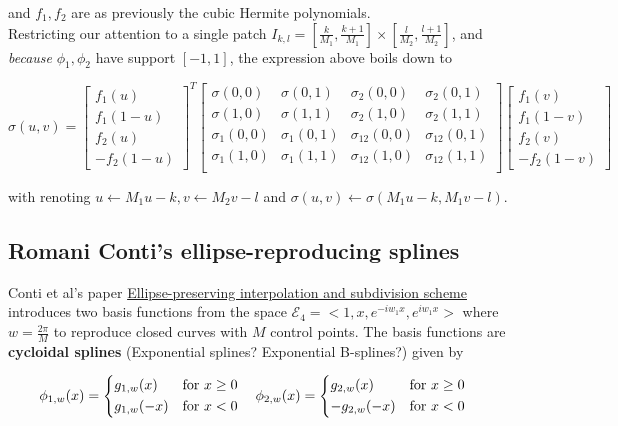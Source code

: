 \documentclass[a4paper, 11pt]{article}
\begin{document}
and $f_1, f_2$ are as previously the cubic Hermite polynomials. \\ 

Restricting our attention to a single patch $I_{k,l} = [\frac{k}{M_1}, \frac{k+1}{M_1}]\times[\frac{l}{M_2}, 
\frac{l+1}{M_2}]$, and \emph{because} $\phi_1, \phi_2$ have support $[-1,1]$, the expression above boils down to

\begin{equation}
  \boxed{\sigma(u, v) = \begin{bmatrix} f_1(u) \\ f_1(1-u) \\  f_2(u) \\ - f_2(1-u) \end{bmatrix}^T
  \begin{bmatrix}
    \sigma(0,0) & \sigma(0,1) & \sigma_2(0,0) & \sigma_2(0,1) \\
    \sigma(1,0) & \sigma(1,1) & \sigma_2(1,0) & \sigma_2(1,1) \\
    \sigma_1(0,0) & \sigma_1(0,1) & \sigma_{12}(0,0) & \sigma_{12}(0,1) \\
    \sigma_1(1,0) & \sigma_1(1,1) & \sigma_{12}(1,0) & \sigma_{12}(1,1) \\
  \end{bmatrix}
  \begin{bmatrix} f_1(v) \\ f_1(1-v) \\ f_2(v) \\ -f_2(1-v) \end{bmatrix}}
\end{equation}

with renoting $u \leftarrow M_1u-k, v \leftarrow M_2v-l$ and $\sigma(u,v) \leftarrow \sigma(M_1u-k, M_1v-l)$.

\subsection{Romani Conti's ellipse-reproducing splines}

Conti et al's paper \underline{Ellipse-preserving interpolation and subdivision scheme} introduces two basis functions 
from the space $\mathcal{E}_4 = <1, x, e^{-iw_1x}, e^{iw_1x}>$ where $w = \frac{2\pi}{M}$ to reproduce closed curves 
with $M$ control points. The basis functions are \textbf{cycloidal splines} (Exponential splines? Exponential 
B-splines?) given by

\begin{equation}
  \phi_{1, w}(x) =
  \begin{dcases}
    g_{1, w}(x) &\text{for } x \geq 0 \\
    g_{1, w}(-x) &\text{for } x < 0\\
  \end{dcases} \quad
  \hfill
  \phi_{2, w}(x) =
  \begin{dcases}
    g_{2, w}(x) &\text{for } x \geq 0 \\
    -g_{2, w}(-x) &\text{for } x < 0\\
  \end{dcases} \quad
\end{equation}
\end{document}
